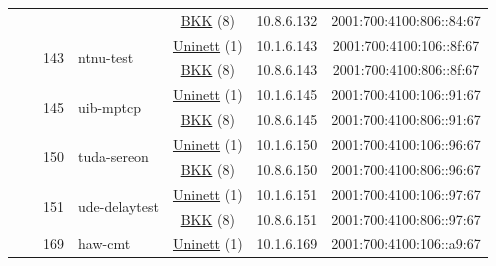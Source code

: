 \begin{small}
\begin{center}
\begin{longtable}{|c|c|c|c|c|c|c|c|}
  &  &  &  & \multicolumn{2}{|c|}{\tiny{\href{http://bkk.no}{BKK} (8)}} & \tiny{10.8.6.132} & \tiny{2001:700:4100:806::84:67} \\* \cline{3-3}\cline{4-4}\cline{5-5}\cline{6-6}\cline{7-7}\cline{8-8}
  &  & \multirow{2}{*}{\tiny{143}} & \multicolumn{1}{|l|}{\multirow{2}{*}{\tiny{ntnu-test}}} & \multicolumn{2}{|c|}{\tiny{\href{https://www.uninett.no}{Uninett} (1)}} & \tiny{10.1.6.143} & \tiny{2001:700:4100:106::8f:67} \\* \cline{5-5}\cline{6-6}\cline{7-7}\cline{8-8}
  &  &  &  & \multicolumn{2}{|c|}{\tiny{\href{http://bkk.no}{BKK} (8)}} & \tiny{10.8.6.143} & \tiny{2001:700:4100:806::8f:67} \\* \cline{3-3}\cline{4-4}\cline{5-5}\cline{6-6}\cline{7-7}\cline{8-8}
  &  & \multirow{2}{*}{\tiny{145}} & \multicolumn{1}{|l|}{\multirow{2}{*}{\tiny{uib-mptcp}}} & \multicolumn{2}{|c|}{\tiny{\href{https://www.uninett.no}{Uninett} (1)}} & \tiny{10.1.6.145} & \tiny{2001:700:4100:106::91:67} \\* \cline{5-5}\cline{6-6}\cline{7-7}\cline{8-8}
  &  &  &  & \multicolumn{2}{|c|}{\tiny{\href{http://bkk.no}{BKK} (8)}} & \tiny{10.8.6.145} & \tiny{2001:700:4100:806::91:67} \\* \cline{3-3}\cline{4-4}\cline{5-5}\cline{6-6}\cline{7-7}\cline{8-8}
  &  & \multirow{2}{*}{\tiny{150}} & \multicolumn{1}{|l|}{\multirow{2}{*}{\tiny{tuda-sereon}}} & \multicolumn{2}{|c|}{\tiny{\href{https://www.uninett.no}{Uninett} (1)}} & \tiny{10.1.6.150} & \tiny{2001:700:4100:106::96:67} \\* \cline{5-5}\cline{6-6}\cline{7-7}\cline{8-8}
  &  &  &  & \multicolumn{2}{|c|}{\tiny{\href{http://bkk.no}{BKK} (8)}} & \tiny{10.8.6.150} & \tiny{2001:700:4100:806::96:67} \\* \cline{3-3}\cline{4-4}\cline{5-5}\cline{6-6}\cline{7-7}\cline{8-8}
  &  & \multirow{2}{*}{\tiny{151}} & \multicolumn{1}{|l|}{\multirow{2}{*}{\tiny{ude-delaytest}}} & \multicolumn{2}{|c|}{\tiny{\href{https://www.uninett.no}{Uninett} (1)}} & \tiny{10.1.6.151} & \tiny{2001:700:4100:106::97:67} \\* \cline{5-5}\cline{6-6}\cline{7-7}\cline{8-8}
  &  &  &  & \multicolumn{2}{|c|}{\tiny{\href{http://bkk.no}{BKK} (8)}} & \tiny{10.8.6.151} & \tiny{2001:700:4100:806::97:67} \\* \cline{3-3}\cline{4-4}\cline{5-5}\cline{6-6}\cline{7-7}\cline{8-8}
  &  & \multirow{2}{*}{\tiny{169}} & \multicolumn{1}{|l|}{\multirow{2}{*}{\tiny{haw-cmt}}} & \multicolumn{2}{|c|}{\tiny{\href{https://www.uninett.no}{Uninett} (1)}} & \tiny{10.1.6.169} & \tiny{2001:700:4100:106::a9:67} \\* \cline{5-5}\cline{6-6}\cline{7-7}\cline{8-8}

\end{longtable}
\end{center}
\end{small}
